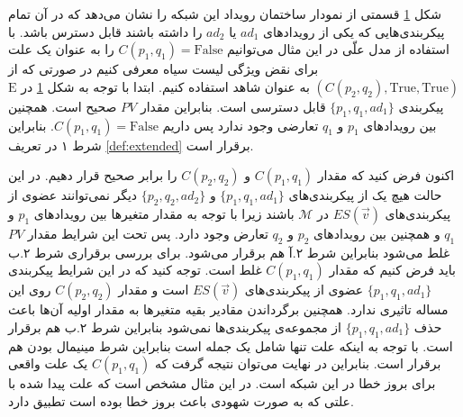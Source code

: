 \documentclass[
msc,
irfonts
]{./tex/tehran-thesis}
\newcommand{\پ}{پروژه/پایان‌نامه/رساله }
\theoremstyle{definition}
\theoremstyle{theorem}
\theoremstyle{definition}
\numberwithin{algorithm}{chapter}
\newcommand{\F}{\mathrm{False}}
\newcommand{\T}{\mathrm{True}}
\newcommand{\s}[1]{\{#1\}}
\newcommand{\crd}[4][above]{
    \node[draw,circle,inner sep=2pt,fill,label={[#1]:#4}] at (#2,#3) {};
}
\newcommand{\mc}[1]{\mathcal{#1}}
\newcommand{\mr}[1]{\mathrm{#1}}
\begin{document}
\begin{figure}
    \centering
    \caption{}
    \label{fig:blacklist:es}
\end{figure}

شکل
\ref{fig:blacklist:es}
قسمتی از نمودار ساختمان رویداد این شبکه را نشان می‌دهد که در آن تمام پیکر‌بندی‌هایی که یکی از رویداد‌های 
$ad_1$
یا
$ad_2$
را داشته باشند
قابل دسترس باشد.
با استفاده از مدل علّی در این مثال می‌توانیم
$C(p_1,q_1) = \F$
را به عنوان یک علت برای نقض ویژگی لیست سیاه معرفی کنیم در صورتی که از
$(C(p_2,q_2),\T,\T)$
به عنوان شاهد استفاده کنیم.
ابتدا با توجه به شکل
\ref{fig:blacklist:es}
در 
$\mr{E}$
پیکربندی 
$\s{p_1,q_1,ad_1}$
قابل دسترسی است.
بنابراین مقدار
$PV$
صحیح است.
همچنین بین رویداد‌های 
$p_1$
و
$q_1$
تعارضی وجود ندارد پس داریم
$C(p_1,q_1) = \F$.
بنابراین شرط ۱ در تعریف 
\ref{def:extended}
برقرار است.

اکنون فرض کنید که مقدار
$C(p_1,q_1)$
و
$C(p_2,q_2)$
را برابر صحیح قرار دهیم.
در این حالت هیچ یک از پیکر‌بندی‌های 
$\s{p_1,q_1,ad_1}$
و
$\s{p_2,q_2,ad_2}$
دیگر نمی‌توانند عضوی از پیکربندی‌های 
$ES(\vec v)$
در 
$\mc{M}$
باشند زیرا با توجه به مقدار متغیر‌ها
بین روید‌اد‌های 
$p_1$
و
$q_1$
و همچنین بین رویداد‌های 
$p_2$
و
$q_2$
تعارض وجود دارد.
پس تحت این شرایط مقدار
$PV$
غلط می‌شود بنابراین شرط 
۲.آ هم برقرار می‌شود.
برای بررسی برقراری شرط ۲.ب
باید فرض کنیم که مقدار
$C(p_1,q_1)$
غلط است.
توجه کنید که در این شرایط پیکربندی
$\s{p_1,q_1,ad_1}$
عضوی از پیکربندی‌های 
$ES(\vec v)$
است و مقدار
$C(p_2,q_2)$
روی این مساله تاثیری ندارد.
همچنین برگرداندن مقادیر بقیه متغیر‌ها به مقدار اولیه آن‌ها باعث حذف 
$\s{p_1,q_1,ad_1}$
از مجموعه‌ی پیکربندی‌ها نمی‌شود بنابراین شرط ۲.ب هم برقرار است.
با توجه به اینکه علت تنها شامل یک جمله است بنابراین شرط مینیمال بودن هم برقرار است.
بنابراین در نهایت می‌توان نتیجه گرفت که 
$C(p_1,q_1)$
یک علت واقعی برای بروز خطا در این شبکه است.
در این مثال مشخص است که علت پیدا شده با علتی که به صورت شهودی باعث بروز خطا بوده است تطبیق دارد.
\end{document}
